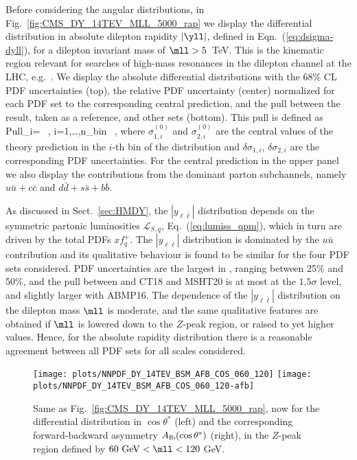 Before considering the angular distributions, in
Fig.~\ref{fig:CMS_DY_14TEV_MLL_5000_rap} we display the 
differential distribution in absolute dilepton rapidity $|\yll|$,
defined in Eqn.~(\ref{eq:dsigma-dyll}),
for a dilepton invariant mass of $\mll > 5$~TeV.
%
This is the kinematic region relevant for searches of high-mass resonances
in the dilepton channel at the LHC, e.g.~\cite{ATLAS:2019erb,Khachatryan:2016zqb}.
%
We display the absolute differential distributions with the 68\% CL PDF uncertainties
(top), the relative PDF uncertainty (center) normalized for each PDF
set to the corresponding central prediction, and the pull between the
 result, taken as a reference, and other sets (bottom).
%
This pull is    defined as
    \be
\label{eq:pulldef_xsec}
{\rm Pull}_i=  \, , \qquad i=1,\ldots,n_{\rm bin} \, ,
\ee
where  $\sigma^{(0)}_{1,i}$ and $\sigma^{(0)}_{2,i}$ are the central values of the
theory prediction in the $i$-th bin of the distribution and $\delta \sigma_{1,i}$, $\delta \sigma_{2,i}$ are
the corresponding PDF uncertainties.
%
For the central  prediction in the upper panel we also display the
contributions from the dominant parton subchannels, namely
$u\bar{u}+c\bar{c}$ and $d\bar{d}+s\bar{s}+b\bar{b}$.

As discussed in Sect.~\ref{sec:HMDY}, the  $|y_{\ell\bar{\ell}}|$  distribution
depends  on the symmetric partonic luminosities $\mathcal{L}_{S,q}$, Eq.~(\ref{eq:lumiss_qpm}),
which in turn are driven by the total PDFs $xf^+_q$.
%
The $|y_{\ell\bar{\ell}}|$  distribution
is dominated by the $u\bar{u}$
contribution and its qualitative behaviour is found to be similar for the four PDF sets considered.
%
PDF uncertainties are the largest in , ranging between 25\% and 50\%,
and the pull between  and  CT18 and MSHT20 is at most at the
$1.5\sigma$ level, and slightly larger  
with ABMP16.
%
The dependence of the $|y_{\ell\bar{\ell}}|$  distribution on the dilepton mass $\mll$
is moderate, and the same qualitative features are
obtained if $\mll$ is lowered down to the $Z$-peak region, or
raised to yet higher values.
%
Hence, for the absolute rapidity distribution there is a
reasonable agreement between all  PDF sets for all scales considered.

\begin{figure}[t]
\centering
\texttt{[image: plots/NNPDF\_DY\_14TEV\_BSM\_AFB\_COS\_060\_120]}
\texttt{[image: plots/NNPDF\_DY\_14TEV\_BSM\_AFB\_COS\_060\_120-afb]}
\caption{Same as Fig.~\ref{fig:CMS_DY_14TEV_MLL_5000_rap}, now for the differential distribution in
  $\cos\theta^*$ (left)
  and the corresponding forward-backward asymmetry
  $A_{\rm fb}(\cos\theta^*)$ (right), in the $Z$-peak region defined by $60~{\rm GeV} < \mll < 120$ GeV.}
\label{fig:CMS_DY_14TEV_MLL_zpeak}
\end{figure}

